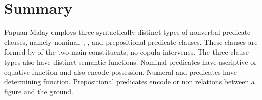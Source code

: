 \section{Summary}
\label{Para_12.5}
Papuan Malay employs three syntactically distinct types of nonverbal predicate clauses, namely nominal, , , and prepositional predicate clauses. These clauses are formed by  of the two main constituents; no copula intervenes. The three clause types also have distinct semantic functions. Nominal predicates have ascriptive or equative function and also encode possession. Numeral and  predicates have determining function. Prepositional predicates encode  or non relations between a figure and the ground.

